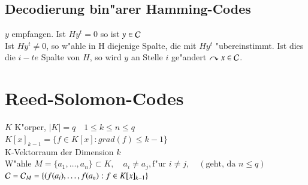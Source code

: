 \subsection{Decodierung bin"arer Hamming-Codes}
$y$ empfangen. Ist $H y^t=0$ so ist $y \in \mathcal{C}$\\%
Ist $Hy^t \neq 0$, so w"ahle in H diejenige Spalte, die mit $Hy^t$ "ubereinstimmt. Ist dies die $i-te$ Spalte von $H$, so wird $y$ an Stelle $i$ ge"andert $\curvearrowright x \in \mathcal{C}$.
\section{Reed-Solomon-Codes}
$K$ K"orper, $\left| K \right|=q \quad 1 \leq k \leq n \leq q$\\
$K[x]_{k-1}=\lbrace f \in K[x] : grad(f) \leq k-1 \rbrace$\\
K-Vektorraum der Dimension $k$\\
W"ahle $M= \lbrace a_1,\ldots,a_n \rbrace \subset K,\quad a_i \neq a_j, \text{f"ur } i \neq j,\quad (\text{geht, da } n \leq q)$\\
$\mathcal{C} = \mathcal{C}_M = \lbrace (f(a_i),\ldots,f(a_n) : f \in K[x]_{k-1} \rbrace$

